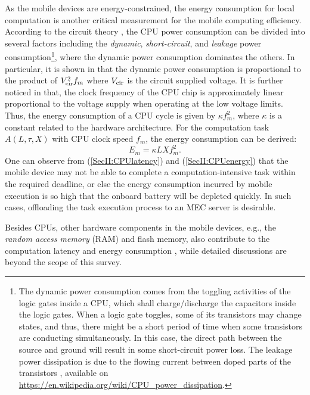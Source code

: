 \documentclass[journal]{IEEEtran}
\begin{document}
As the mobile devices are energy-constrained, the  energy consumption for local computation is another critical measurement for the  mobile computing efficiency. According to the circuit theory \cite{BurdVLSI96,WYuanACMTOCS0608,Vogeleer2013CPUenergy,WZhangTWC1312}, the CPU power consumption can be divided into several factors including the \emph{dynamic}, \emph{short-circuit}, and \emph{leakage} power consumption\footnote{The dynamic power consumption comes from the toggling activities of the logic gates inside a CPU, which shall charge/discharge the capacitors inside the logic gates. When a logic gate toggles, some of its transistors may change states, and thus, there might be a short period of time when some transistors are conducting simultaneously. In this case, the direct path between the source and ground will result in some short-circuit power loss. The leakage power dissipation is due to the flowing current between doped parts of the transistors \cite{Vogeleer2013CPUenergy}, available on \url{https://en.wikipedia.org/wiki/CPU_power_dissipation}.}, where the dynamic power consumption  dominates the others. In particular, it is shown in \cite{Vogeleer2013CPUenergy} that the dynamic power consumption is proportional to the product of $V_{\rm{cir}}^{2}f_{m}$ where $V_{\rm{cir}}$ is the circuit supplied voltage. It is further noticed in \cite{BurdVLSI96,WZhangTWC1312} that, the clock frequency of the CPU chip is approximately linear proportional to the voltage supply when operating at the low voltage limits. Thus, the energy consumption of a CPU cycle is given by $\kappa f^{2}_{m}$, where $\kappa$ is a constant related to the hardware architecture. For the computation task $A\left(L,\tau,X\right)$ with CPU clock speed $f_{m}$, the energy consumption can be derived:
\begin{equation}
E_{m} = \kappa LX f^{2}_{m}.
\label{SecII:CPUenergy}
\end{equation}
One can observe  from (\ref{SecII:CPUlatency}) and (\ref{SecII:CPUenergy}) that the mobile device may not be able to complete a computation-intensive task within the required  deadline, or else the energy consumption incurred by mobile execution is so high that the onboard battery will be depleted quickly. In such cases, offloading the task execution process to an MEC server is desirable.

Besides CPUs, other hardware components in the mobile devices, e.g., the \emph{random access memory} (RAM) and flash memory, also contribute to  the computation  latency and energy consumption \cite{Carroll:2010:APC:1855840.1855861}, while detailed discussions are beyond the scope of this survey.\\
\end{document}
